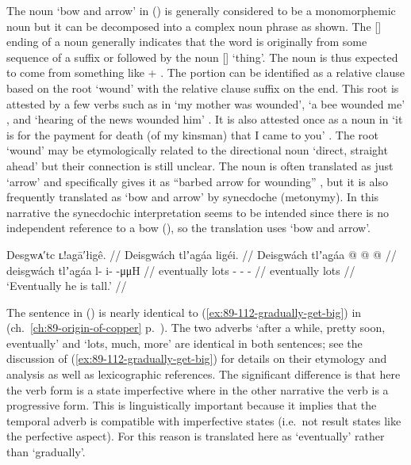 The noun  ‘bow and arrow’ in (\lastx) is generally considered to be a monomorphemic noun but it can be decomposed into a complex noun phrase as shown.
The  [] ending of a noun generally indicates that the word is originally from some sequence of a suffix  or  followed by the noun  [] ‘thing’.
The noun  is thus expected to come from something like  + .
The  portion can be identified as a relative clause based on the root  ‘wound’ with the relative clause suffix  on the end.
This root is attested by a few verbs such as in  ‘my mother was wounded’,  ‘a bee wounded me’ \parencite[both from][250]{story-naish:1973}, and  ‘hearing of the news wounded him’ \parencite[10/214]{leer:1973}.
It is also attested once as a noun in  ‘it is for the payment for death (of my kinsman) that I came to you’ \parencite[10/213]{leer:1973}.
The root  ‘wound’ may be etymologically related to the directional noun  ‘direct, straight ahead’ but their connection is still unclear.
The noun  is often translated as just ‘arrow’ and \citeauthor{leer:1973} specifically gives it as “barbed arrow for wounding” \parencite[10/213]{leer:1973}, but it is also frequently translated as ‘bow and arrow’ by synecdoche (metonymy).
In this narrative the synecdochic interpretation seems to be intended since there is no independent reference to a bow (), so the translation uses ‘bow and arrow’.

\ex\label{ex:91-4-gradually-is-big}%
%
\begingl
	\glpreamble	Desgwᴀ′tc ʟ!agā′łigê. //
	\glpreamble	Deisgwách tlʼag̱áa ligéi. //
	\gla	Deisgwách tlʼag̱áa  @ {} @ {} @ {} //
	\glb	deisgwách tlʼag̱áa l- i-  -μμH //
	\glc	eventually lots - -  - //
	\gld	eventually lots  {} {} {} //
	\glft	‘Eventually he is tall.’
		//
\endgl
\xe

The sentence in (\lastx) is nearly identical to (\ref{ex:89-112-gradually-get-big}) in  (ch.\ \ref{ch:89-origin-of-copper} p.\ \pageref{ex:89-112-gradually-get-big}).
The two adverbs  ‘after a while, pretty soon, eventually’ and  ‘lots, much, more’ are identical in both sentences; see the discussion of (\ref{ex:89-112-gradually-get-big}) for details on their etymology and analysis as well as lexicographic references.
The significant difference is that here the verb form is a state imperfective where in the other narrative the verb is a progressive form.
This is linguistically important because it implies that the temporal adverb  is compatible with imperfective states (i.e.\ not result states like the perfective aspect).
For this reason  is translated here as ‘eventually’ rather than ‘gradually’.

